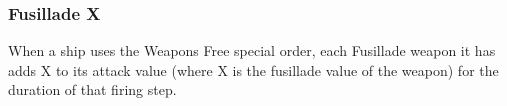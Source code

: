 \subsubsection{Fusillade X}
When a ship uses the Weapons Free special order, each Fusillade weapon it has adds X to its attack value (where X is the fusillade value of the weapon) for the duration of that firing step.
